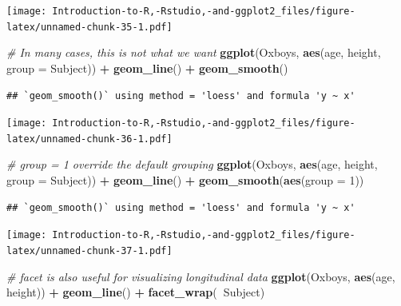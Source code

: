 \documentclass[]{book}
\newenvironment{Shaded}{\begin{snugshade}}{\end{snugshade}}
\newcommand{\CommentTok}[1]{\textcolor[rgb]{0.56,0.35,0.01}{\textit{#1}}}
\newcommand{\DataTypeTok}[1]{\textcolor[rgb]{0.13,0.29,0.53}{#1}}
\newcommand{\DecValTok}[1]{\textcolor[rgb]{0.00,0.00,0.81}{#1}}
\newcommand{\KeywordTok}[1]{\textcolor[rgb]{0.13,0.29,0.53}{\textbf{#1}}}
\newcommand{\NormalTok}[1]{#1}
\newcommand{\OperatorTok}[1]{\textcolor[rgb]{0.81,0.36,0.00}{\textbf{#1}}}
\newcommand{\StringTok}[1]{\textcolor[rgb]{0.31,0.60,0.02}{#1}}
\begin{document}
\texttt{[image: Introduction-to-R,-Rstudio,-and-ggplot2\_files/figure-latex/unnamed-chunk-35-1.pdf]}

\begin{Shaded}
\begin{Highlighting}[]
\CommentTok{# In many cases, this is not what we want}
\KeywordTok{ggplot}\NormalTok{(Oxboys, }\KeywordTok{aes}\NormalTok{(age, height, }\DataTypeTok{group =}\NormalTok{ Subject)) }\OperatorTok{+}\StringTok{ }\KeywordTok{geom_line}\NormalTok{() }\OperatorTok{+}\StringTok{ }\KeywordTok{geom_smooth}\NormalTok{()}
\end{Highlighting}
\end{Shaded}

\begin{verbatim}
## `geom_smooth()` using method = 'loess' and formula 'y ~ x'
\end{verbatim}

\texttt{[image: Introduction-to-R,-Rstudio,-and-ggplot2\_files/figure-latex/unnamed-chunk-36-1.pdf]}

\begin{Shaded}
\begin{Highlighting}[]
\CommentTok{# group = 1 override the default grouping }
\KeywordTok{ggplot}\NormalTok{(Oxboys, }\KeywordTok{aes}\NormalTok{(age, height, }\DataTypeTok{group =}\NormalTok{ Subject)) }\OperatorTok{+}\StringTok{ }\KeywordTok{geom_line}\NormalTok{() }\OperatorTok{+}\StringTok{ }\KeywordTok{geom_smooth}\NormalTok{(}\KeywordTok{aes}\NormalTok{(}\DataTypeTok{group =} \DecValTok{1}\NormalTok{))}
\end{Highlighting}
\end{Shaded}

\begin{verbatim}
## `geom_smooth()` using method = 'loess' and formula 'y ~ x'
\end{verbatim}

\texttt{[image: Introduction-to-R,-Rstudio,-and-ggplot2\_files/figure-latex/unnamed-chunk-37-1.pdf]}

\begin{Shaded}
\begin{Highlighting}[]
\CommentTok{# facet is also useful for visualizing longitudinal data}
\KeywordTok{ggplot}\NormalTok{(Oxboys, }\KeywordTok{aes}\NormalTok{(age, height)) }\OperatorTok{+}\StringTok{ }\KeywordTok{geom_line}\NormalTok{() }\OperatorTok{+}\StringTok{ }\KeywordTok{facet_wrap}\NormalTok{(}\OperatorTok{~}\NormalTok{Subject)}
\end{Highlighting}
\end{Shaded}
\end{document}
